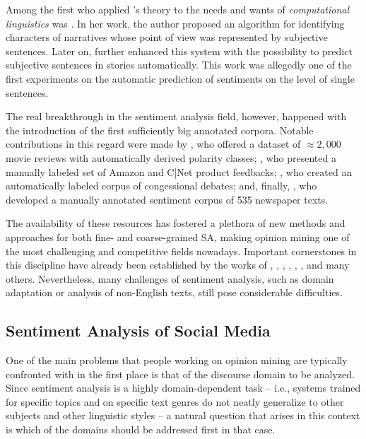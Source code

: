 Among the first who applied \citeauthor{Banfield:82}'s theory to the
needs and wants of \emph{computational linguistics} was
\citet{Wiebe:90a}.  In her work, the author proposed an algorithm for
identifying characters of narratives whose point of view was
represented by subjective sentences.  Later on, \citet{Wiebe:94}
further enhanced this system with the possibility to predict
subjective sentences in stories automatically.  This work was
allegedly one of the first experiments on the automatic prediction of
sentiments on the level of single sentences.

The real breakthrough in the sentiment analysis field, however,
happened with the introduction of the first sufficiently big annotated
corpora.  Notable contributions in this regard were made by
\citet{Pang:04,Pang:05}, who offered a dataset of $\approx2,000$ movie
reviews with automatically derived polarity classes; \citet{Hu:04},
who presented a manually labeled set of Amazon and C|Net product
feedbacks; \citet{Thomas:06}, who created an automatically labeled
corpus of congessional debates; and, finally, \citet{Wiebe:05}, who
developed a manually annotated sentiment corpus of 535 newspaper
texts.

The availability of these resources has fostered a plethora of new
methods and approaches for both fine- and coarse-grained SA, making
opinion mining one of the most challenging and competitive fields
nowadays.  Important cornerstones in this discipline have already been
established by the works of \citet{Pang:02}, \citet{Wiebe:05},
\citet{Wilson:05}, \citet{Breck:07}, \citet{Choi:09,Choi:10},
\citet{Yessenalina:11}, \citet{Socher:11, Socher:12} and many others.
Nevertheless, many challenges of sentiment analysis, such as domain
adaptation or analysis of non-English texts, still pose considerable
difficulties.

\subsection{Sentiment Analysis of Social Media}

One of the main problems that people working on opinion mining are
typically confronted with in the first place is that of the discourse
domain to be analyzed.  Since sentiment analysis is a highly
domain-dependent task \citep[cf.][]{Aue:05,Blitzer:07,Li:08} -- i.e.,
systems trained for specific topics and on specific text genres do not
neatly generalize to other subjects and other linguistic styles -- a
natural question that arises in this context is which of the domains
should be addressed first in that case.


